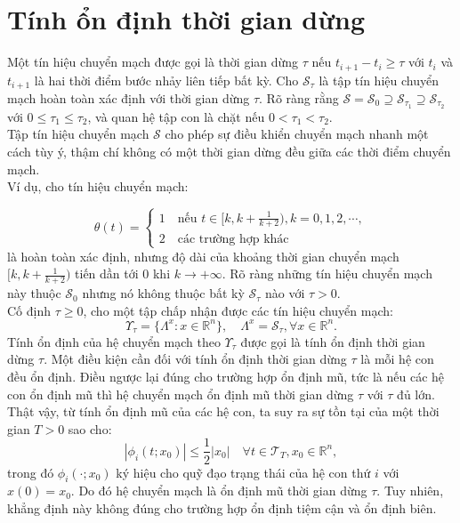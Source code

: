 \documentclass[14pt,a4paper,oneside]{report}		%
\theoremstyle{definition}
\begin{document}
\section{Tính ổn định thời gian dừng}
Một tín hiệu chuyển mạch được gọi là thời gian dừng $\tau$ nếu $t_{i+1}-t_i\geq\tau$ với $t_i$ và $t_{i+1}$ là hai thời điểm bước nhảy liên tiếp bất kỳ. Cho $\mathcal{S}_\tau$ là tập tín hiệu chuyển mạch hoàn toàn xác định với thời gian dừng $\tau$. Rõ ràng rằng $\mathcal{S}=\mathcal{S}_0\supseteq\mathcal{S}_{\tau_1}\supseteq\mathcal{S}_{\tau_2}$ với $0\leq\tau_1\leq\tau_2$, và quan hệ tập con là chặt nếu $0<\tau_1<\tau_2$.\\

Tập tín hiệu chuyển mạch $\mathcal{S}$ cho phép sự điều khiển chuyển mạch nhanh một cách tùy ý, thậm chí không có một thời gian dừng đều giữa các thời điểm chuyển mạch.\\

Ví dụ, cho tín hiệu chuyển mạch:

$$\theta(t)=\begin{cases}
1\quad\text{nếu } t\in[k,k+\frac{1}{k+2}), k=0,1,2,\cdots,\\
2\quad\text{các trường hợp khác}
\end{cases}$$
là hoàn toàn xác định, nhưng độ dài của khoảng thời gian chuyển mạch $[k,k+\frac{1}{k+2})$ tiến dần tới $0$ khi $k\rightarrow +\infty$. Rõ ràng những tín hiệu chuyển mạch này thuộc $\mathcal{S}_0$ nhưng nó không thuộc bất kỳ $\mathcal{S}_\tau$ nào với $\tau>0$.\\

Cố định $\tau \geq 0$, cho một tập chấp nhận được các tín hiệu chuyển mạch:
$$\Upsilon_\tau=\{\Lambda^x:x\in\mathbb{R}^n\},\quad \Lambda^x=\mathcal{S}_\tau,\forall x\in\mathbb{R}^n.$$
Tính ổn định của hệ chuyển mạch theo $\Upsilon_\tau$ được gọi là tính ổn định thời gian dừng $\tau$. Một điều kiện cần đối với tính ổn định thời gian dừng $\tau$ là mỗi hệ con đều ổn định. Điều ngược lại đúng cho trường hợp ổn định mũ, tức là nếu các hệ con ổn định mũ thì hệ chuyển mạch ổn định mũ thời gian dừng $\tau$ với $\tau$ đủ lớn. Thật vậy, từ tính ổn định mũ của các hệ con, ta suy ra sự tồn tại của một thời gian $T>0$ sao cho:
$$|\phi_i(t;x_0)|\leq\frac{1}{2}|x_0|\quad\forall t\in\mathcal{T}_T,x_0\in\mathbb{R}^n,$$
trong đó $\phi_i(\cdot;x_0)$ ký hiệu cho quỹ đạo trạng thái của hệ con thứ $i$ với $x(0) = x_0$. Do đó hệ chuyển mạch là ổn định mũ thời gian dừng $\tau$. Tuy nhiên, khẳng định này không đúng cho trường hợp ổn định tiệm cận và ổn định biên.
\end{document}
